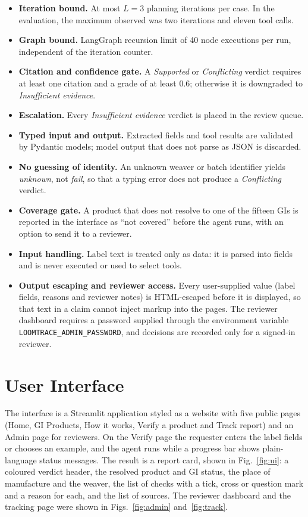 \begin{itemize}[itemsep=2pt]
\item \textbf{Iteration bound.} At most $L = 3$ planning iterations per case. In the evaluation, the
maximum observed was two iterations and eleven tool calls.
\item \textbf{Graph bound.} LangGraph recursion limit of 40 node executions per run, independent of the
iteration counter.
\item \textbf{Citation and confidence gate.} A \emph{Supported} or \emph{Conflicting} verdict requires
at least one citation and a grade of at least 0.6; otherwise it is downgraded to \emph{Insufficient
evidence}.
\item \textbf{Escalation.} Every \emph{Insufficient evidence} verdict is placed in the review queue.
\item \textbf{Typed input and output.} Extracted fields and tool results are validated by Pydantic
models; model output that does not parse as JSON is discarded.
\item \textbf{No guessing of identity.} An unknown weaver or batch identifier yields \emph{unknown}, not
\emph{fail}, so that a typing error does not produce a \emph{Conflicting} verdict.
\item \textbf{Coverage gate.} A product that does not resolve to one of the fifteen GIs is reported in the
interface as ``not covered'' before the agent runs, with an option to send it to a reviewer.
\item \textbf{Input handling.} Label text is treated only as data: it is parsed into fields and is never
executed or used to select tools.
\item \textbf{Output escaping and reviewer access.} Every user-supplied value (label fields, reasons and
reviewer notes) is HTML-escaped before it is displayed, so that text in a claim cannot inject markup
into the pages. The reviewer dashboard requires a password supplied through the environment variable
\texttt{LOOMTRACE\_ADMIN\_PASSWORD}, and decisions are recorded only for a signed-in reviewer.
\end{itemize}

\section{User Interface}

The interface is a Streamlit application styled as a website with five public pages (Home, GI Products,
How it works, Verify a product and Track report) and an Admin page for reviewers. On the Verify page
the requester enters the label fields or chooses an example, and the agent runs while a progress bar
shows plain-language status messages. The result is a report card, shown in Fig.~\ref{fig:ui}: a
coloured verdict header, the resolved product and GI status, the place of manufacture and the weaver,
the list of checks with a tick, cross or question mark and a reason for each, and the list of sources.
The reviewer dashboard and the tracking page were shown in Figs.~\ref{fig:admin} and~\ref{fig:track}.

